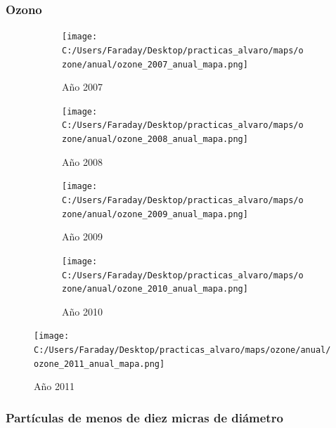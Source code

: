 \documentclass[12pt]{article}
\begin{document}
\subsubsection*{Ozono}
%

\begin{figure}[H]
\centering
\begin{subfigure}[h]{0.45\textwidth}
\texttt{[image: C:/Users/Faraday/Desktop/practicas\_alvaro/maps/ozone/anual/ozone\_2007\_anual\_mapa.png]}
\caption{Año 2007}
\label{fig:map-ann-2-1}
\end{subfigure}
%
\begin{subfigure}[H]{0.45\textwidth}
\texttt{[image: C:/Users/Faraday/Desktop/practicas\_alvaro/maps/ozone/anual/ozone\_2008\_anual\_mapa.png]}
\caption{Año 2008}
\label{fig:map-ann-2-2}
\end{subfigure}
\caption{}
\end{figure}

\newpage

\begin{figure}[H]
\centering
\begin{subfigure}[h]{0.45\textwidth}
\texttt{[image: C:/Users/Faraday/Desktop/practicas\_alvaro/maps/ozone/anual/ozone\_2009\_anual\_mapa.png]}
\caption{Año 2009}
\label{fig:map-ann-2-3}
\end{subfigure}
%
\begin{subfigure}[H]{0.45\textwidth}
\texttt{[image: C:/Users/Faraday/Desktop/practicas\_alvaro/maps/ozone/anual/ozone\_2010\_anual\_mapa.png]}
\caption{Año 2010}
\label{fig:map-ann-2-4}
\end{subfigure}
\caption{}
\end{figure}

\vspace{30mm}

\begin{figure}[H]
\centering
\texttt{[image: C:/Users/Faraday/Desktop/practicas\_alvaro/maps/ozone/anual/ozone\_2011\_anual\_mapa.png]}
\caption{Año 2011}
\label{fig:map-ann-2-5}
\end{figure}

\newpage

\subsubsection*{Partículas de menos de diez micras de diámetro}
%
\end{document}
